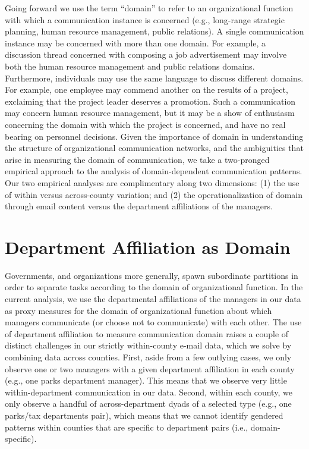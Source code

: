 \documentclass{pnastwo}
\begin{document}
\begin{article}
Going forward we use the term ``domain'' to refer to an organizational function with which a communication instance is concerned (e.g., long-range strategic planning, human resource management, public relations). A single communication instance may be concerned with more than one domain. For example, a discussion thread concerned with composing a job advertisement may involve both the human resource management and public relations domains. Furthermore, individuals may use the same language to discuss different domains. For example, one employee may commend another on the results of a project, exclaiming that the project leader deserves a promotion. Such a communication may concern human resource management, but it may be a show of enthusiasm concerning the domain with which the project is concerned, and have no real bearing on personnel decisions. Given the importance of domain in understanding the structure of organizational communication networks, and the ambiguities that arise in measuring the domain of communication, we take a two-pronged empirical approach to the analysis of domain-dependent communication patterns. Our two empirical analyses are complimentary along two dimensions: (1) the use of within versus across-county variation; and (2) the operationalization of domain through email content versus the department affiliations of the managers.


\section{Department Affiliation as Domain}

Governments, and organizations more generally, spawn subordinate partitions in order to separate tasks according to the domain of organizational function. In the current analysis, we use the departmental affiliations of the managers in our data as proxy measures for the domain of organizational function about which managers communicate (or choose not to communicate) with each other. The use of department affiliation to measure communication domain raises a couple of distinct challenges in our strictly within-county e-mail data, which we solve by combining data across counties. First, aside from a few outlying cases, we only observe one or two managers with a given department affiliation in each county (e.g., one parks department manager). This means that we observe very little within-department communication in our data. Second, within each county, we only observe a handful of across-department dyads of a selected type (e.g., one parks/tax departments pair), which means that we cannot identify gendered patterns within counties that are specific to department pairs (i.e., domain-specific).


\end{article}
\end{document}
